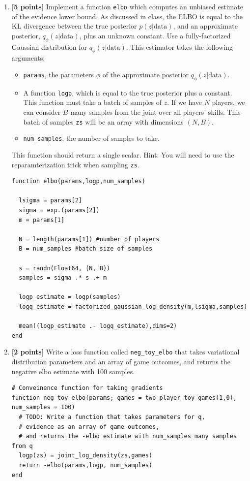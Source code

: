 \documentclass{article}
\begin{document}
\begin{enumerate}[label=(\alph*)]
  \item {\bf [5 points]} Implement a function \texttt{elbo} which computes an unbiased estimate of 
    the evidence lower bound.
    As discussed in class, the ELBO is equal to the KL divergence between the true posterior $p(z|\text{data})$, and an approximate posterior, $q_\phi(z|\text{data})$, plus an unknown constant.
    Use a fully-factorized Gaussian distribution for $q_\phi(z|\text{data})$.
    This estimator takes the following arguments:
    \begin{itemize}
    	\item \texttt{params}, the parameters $\phi$ of the approximate posterior $q_\phi(z|\text{data})$.
    	\item A function \texttt{logp}, which is equal to the true posterior plus a constant.  This function must take a batch of samples of $z$.  If we have $N$ players, we can consider $B$-many samples from the joint over all players' skills.
    	This batch of samples \texttt{zs} will be an array with dimensions $(N,B)$.
    	\item \texttt{num\_samples}, the number of samples to take.
    \end{itemize}
    This function should return a single scalar.
    Hint: You will need to use the reparamterization trick when sampling \texttt{zs}.

\begin{verbatim}
function elbo(params,logp,num_samples)

  lsigma = params[2]
  sigma = exp.(params[2])
  m = params[1]

  N = length(params[1]) #number of players
  B = num_samples #batch size of samples

  s = randn(Float64, (N, B))
  samples = sigma .* s .+ m

  logp_estimate = logp(samples)
  logq_estimate = factorized_gaussian_log_density(m,lsigma,samples)

  mean((logp_estimate .- logq_estimate),dims=2)
end
\end{verbatim}
    
  \item {\bf [2 points]} Write a loss function called \texttt{neg\_toy\_elbo}
    that takes variational distribution parameters and an array of game outcomes, and returns the negative
    elbo estimate with 100 samples.

\begin{verbatim}
# Conveinence function for taking gradients
function neg_toy_elbo(params; games = two_player_toy_games(1,0), num_samples = 100)
  # TODO: Write a function that takes parameters for q,
  # evidence as an array of game outcomes,
  # and returns the -elbo estimate with num_samples many samples from q
  logp(zs) = joint_log_density(zs,games)
  return -elbo(params,logp, num_samples)
end
\end{verbatim}
    

\end{enumerate}
\end{document}
